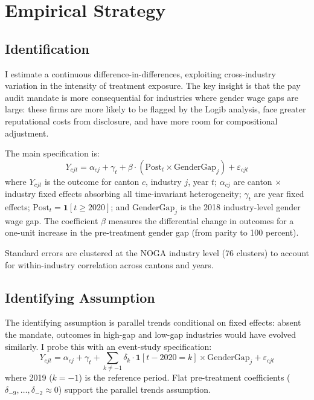 \documentclass[12pt]{article}
\begin{document}



\section{Empirical Strategy}

\subsection{Identification}

I estimate a continuous difference-in-differences, exploiting cross-industry variation in the intensity of treatment exposure. The key insight is that the pay audit mandate is more consequential for industries where gender wage gaps are large: these firms are more likely to be flagged by the Logib analysis, face greater reputational costs from disclosure, and have more room for compositional adjustment.

The main specification is:
\begin{equation}
Y_{cjt} = \alpha_{cj} + \gamma_t + \beta \cdot (\text{Post}_t \times \text{GenderGap}_j) + \varepsilon_{cjt}
\label{eq:main}
\end{equation}
where $Y_{cjt}$ is the outcome for canton $c$, industry $j$, year $t$; $\alpha_{cj}$ are canton $\times$ industry fixed effects absorbing all time-invariant heterogeneity; $\gamma_t$ are year fixed effects; $\text{Post}_t = \mathbf{1}[t \geq 2020]$; and $\text{GenderGap}_j$ is the 2018 industry-level gender wage gap. The coefficient $\beta$ measures the differential change in outcomes for a one-unit increase in the pre-treatment gender gap (from parity to 100 percent).

Standard errors are clustered at the NOGA industry level (76 clusters) to account for within-industry correlation across cantons and years.

\subsection{Identifying Assumption}

The identifying assumption is parallel trends conditional on fixed effects: absent the mandate, outcomes in high-gap and low-gap industries would have evolved similarly. I probe this with an event-study specification:
\begin{equation}
Y_{cjt} = \alpha_{cj} + \gamma_t + \sum_{k \neq -1} \delta_k \cdot \mathbf{1}[t - 2020 = k] \times \text{GenderGap}_j + \varepsilon_{cjt}
\label{eq:event}
\end{equation}
where 2019 ($k = -1$) is the reference period. Flat pre-treatment coefficients ($\delta_{-9}, \ldots, \delta_{-2} \approx 0$) support the parallel trends assumption.
\end{document}
